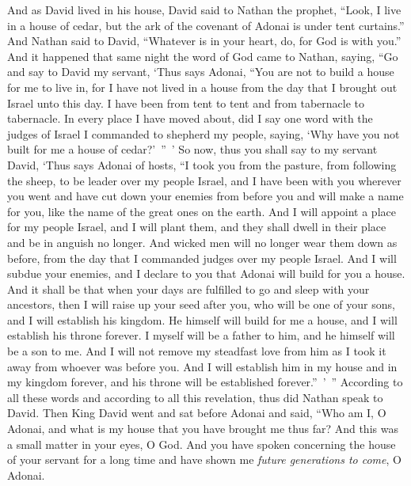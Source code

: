\begin{biblechapter} %
 And as David lived in his house, David said to Nathan the prophet, “Look, I live in a house of cedar, but the ark of the covenant of Adonai is under tent curtains.”
\verse And Nathan said to David, “Whatever is in your heart, do, for God is with you.”
\verse And it happened that same night the word of God came to Nathan, saying,
\verse “Go and say to David my servant, ‘Thus says Adonai, “You are not to build a house for me to live in,
\verse for I have not lived in a house from the day that I brought out Israel unto this day. I have been from tent to tent and from tabernacle to tabernacle.
\verse In every place I have moved about, did I say one word with the judges of Israel I commanded to shepherd my people, saying, ‘Why have you not built for me a house of cedar?’ ” ’
\verse So now, thus you shall say to my servant David, ‘Thus says Adonai of hosts, “I took you from the pasture, from following the sheep, to be leader over my people Israel,
\verse and I have been with you wherever you went and have cut down your enemies from before you and will make a name for you, like the name of the great ones on the earth.
\verse And I will appoint a place for my people Israel, and I will plant them, and they shall dwell in their place and be in anguish no longer. And wicked men will no longer wear them down as before,
\verse from the day that I commanded judges over my people Israel. And I will subdue your enemies, and I declare to you that Adonai will build for you a house.
\verse And it shall be that when your days are fulfilled to go and sleep with your ancestors, then I will raise up your seed after you, who will be one of your sons, and I will establish his kingdom.
\verse He himself will build for me a house, and I will establish his throne forever.
\verse I myself will be a father to him, and he himself will be a son to me. And I will not remove my steadfast love from him as I took it away from whoever was before you.
\verse And I will establish him in my house and in my kingdom forever, and his throne will be established forever.” ’ ”
\verse According to all these words and according to all this revelation, thus did Nathan speak to David.
 Then King David went and sat before Adonai and said, “Who am I, O Adonai, and what is my house that you have brought me thus far?
\verse And this was a small matter in your eyes, O God. And you have spoken concerning the house of your servant for a long time and have shown me \textit{future generations to come}, O Adonai.

\end{biblechapter}
